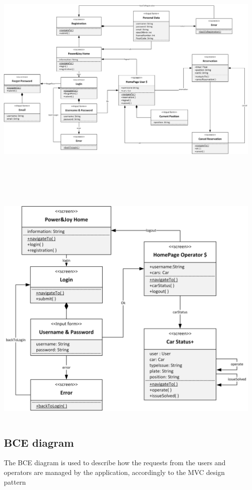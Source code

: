 \documentclass{article}
\begin{document}
\begin{flushleft}
\includegraphics[width=15cm, height=12cm]{UxRegistrationReservation} \break
 



\includegraphics[width=15cm, height=12cm]{operatorux} 
\newpage
\subsection{BCE diagram}
The BCE diagram is used to describe how the requests from the users and operators are managed by the application, accordingly to the MVC design pattern


\end{flushleft}
\end{document}
